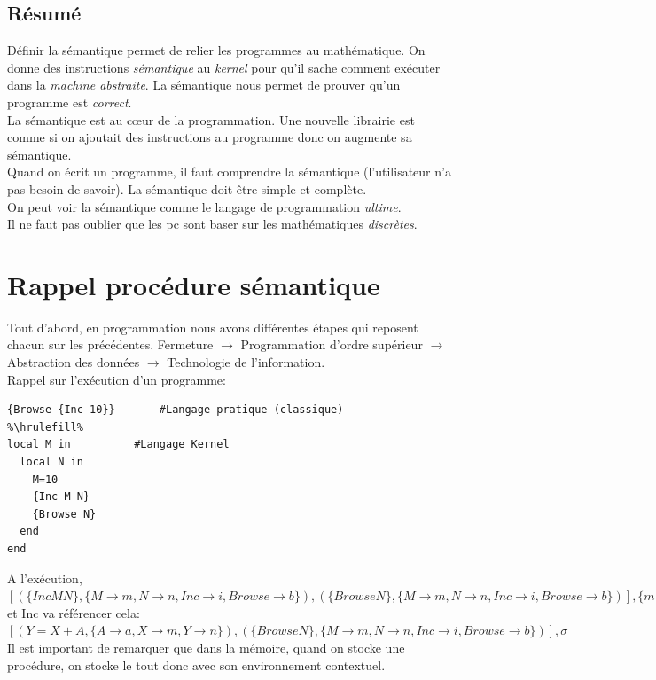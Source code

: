 \documentclass{report}
\begin{document}
\subsection{Résumé}
Définir la sémantique permet de relier les programmes au mathématique. On donne des instructions \textit{sémantique} au \textit{kernel} pour qu'il sache comment exécuter dans la \textit{machine abstraite}. La sémantique nous permet de prouver qu'un programme est \textit{correct}.\\
La sémantique est au cœur de la programmation. Une nouvelle librairie est comme si on ajoutait des instructions au programme donc on augmente sa sémantique.\\
Quand on écrit un programme, il faut comprendre la sémantique (l'utilisateur n'a pas besoin de savoir). La sémantique doit être simple et complète.\\
On peut voir la sémantique comme le langage de programmation \textit{ultime}.\\
Il ne faut pas oublier que les pc sont baser sur les mathématiques \textit{discrètes}.

\section{Rappel procédure sémantique}
Tout d'abord, en programmation nous avons différentes étapes qui reposent chacun sur les précédentes. Fermeture $\rightarrow$ Programmation d'ordre supérieur $\rightarrow$ Abstraction des données $\rightarrow$ Technologie de l'information.\\

Rappel sur l'exécution d'un programme:
\begin{lstlisting}[escapechar=\%]
{Browse {Inc 10}}		#Langage pratique (classique)
%\hrulefill%
local M in		 	#Langage Kernel
  local N in
    M=10
    {Inc M N}
    {Browse N}
  end
end
\end{lstlisting}
A l'exécution,$[(\{Inc M N\},\{M\rightarrow m,N \rightarrow n,Inc \rightarrow i,Browse \rightarrow b\}), (\{Browse N\},\{M \rightarrow m,N \rightarrow n,Inc \rightarrow i,Browse \rightarrow b\})],
\{m=10,n,i=(proc \{\$ X Y\} Y=X+A end, \{A \rightarrow a\}), a=1,b=(... browser code…)\}$ et Inc va référencer cela:\\
$[(Y=X+A,\{A\rightarrow a,X \rightarrow m,Y \rightarrow n\}), (\{Browse N\},\{M \rightarrow m,N \rightarrow n,Inc \rightarrow i,Browse \rightarrow b\})],
\sigma$\\
Il est important de remarquer que dans la mémoire, quand on stocke une procédure, on stocke le tout donc avec son environnement contextuel.
\end{document}
